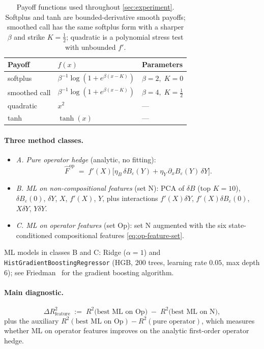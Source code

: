 \documentclass[11pt,reqno]{amsart}
\theoremstyle{plain}
\theoremstyle{definition}
\theoremstyle{remark}
\newcommand{\Bvar}{B}
\newcommand{\Yclock}{Y}
\begin{document}
\begin{table}[ht]
\centering
\begin{tabular}{lll}
\toprule
Payoff & $f(x)$ & Parameters \\
\midrule
softplus       & $\beta^{-1}\log(1+e^{\beta(x-K)})$ & $\beta=2,\;K=0$ \\
smoothed call  & $\beta^{-1}\log(1+e^{\beta(x-K)})$ & $\beta=4,\;K=\tfrac12$ \\
quadratic      & $x^{2}$                            & --- \\
tanh           & $\tanh(x)$                         & --- \\
\bottomrule
\end{tabular}
\caption{Payoff functions used throughout
\cref{sec:experiment}. Softplus and tanh are bounded-derivative
smooth payoffs; smoothed call has the same softplus form with a
sharper $\beta$ and strike $K=\tfrac12$; quadratic is a
polynomial stress test with unbounded $f'$.}
\label{tab:payoffs}
\end{table}

\paragraph{Three method classes.}
\begin{itemize}
\item \emph{A. Pure operator hedge} (analytic, no fitting):
\[
  \widehat F^{\mathrm{op}}
   \;=\;f'(X)\bigl[\eta_{B}\,\delta\Bvar_{\varepsilon}(\Yclock)
        +\eta_{Y}\,\partial_{x}\Bvar_{\varepsilon}(\Yclock)\,\delta\Yclock\bigr].
\]
\item \emph{B. ML on non-compositional features} (set N): PCA
of $\delta\Bvar$ (top $K=10$),
$\delta\Bvar_{\varepsilon}(0)$, $\delta\Yclock$, $X$, $f'(X)$,
$\Yclock$, plus interactions
$f'(X)\delta\Yclock$, $f'(X)\delta\Bvar_{\varepsilon}(0)$,
$X\delta\Yclock$, $\Yclock\delta\Yclock$.
\item \emph{C. ML on operator features} (set Op): set N
augmented with the six state-conditioned compositional features
\eqref{eq:op-feature-set}.
\end{itemize}
ML models in classes B and C: Ridge ($\alpha=1$) and
\texttt{HistGradientBoostingRegressor} (HGB, $200$ trees,
learning rate $0.05$, max depth $6$); see
Friedman~\cite{FriedmanGBM} for the gradient boosting algorithm.

\paragraph{Main diagnostic.}
\begin{equation}\label{eq:delta-feature}
  \Delta R^{2}_{\mathrm{feature}}\;:=\;R^{2}\bigl(\text{best ML on Op}\bigr)\;-\;R^{2}\bigl(\text{best ML on N}\bigr),
\end{equation}
plus the auxiliary
$R^{2}(\text{best ML on Op})-R^{2}(\text{pure operator})$,
which measures whether ML on operator features improves on the
analytic first-order operator hedge.
\end{document}
